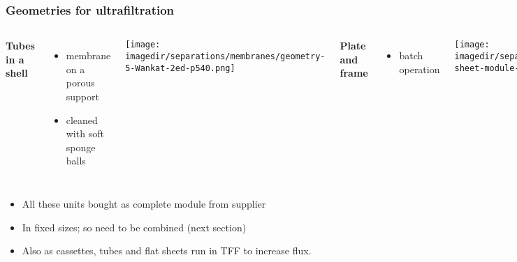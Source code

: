 \begin{frame}\frametitle{Geometries for ultrafiltration}
	\begin{columns}[t]
			\textbf{Tubes in a shell}
				\begin{itemize}
					\item	membrane on a porous support
					\item	cleaned with soft sponge balls
				\end{itemize}
			\begin{center}
				\texttt{[image: \\imagedir/separations/membranes/geometry-5-Wankat-2ed-p540.png]}
			\end{center}
			\textbf{Plate and frame}
				\begin{itemize}
					\item	batch operation
				\end{itemize}
				\begin{center}
					\texttt{[image: \\imagedir/separations/membranes/flat-sheet-module-CRv2-5ed-p456.png]}
				\end{center}
	\end{columns}
	\begin{itemize}
		\item	All these units bought as complete module from supplier
		\item	In fixed sizes; so need to be combined (next section)
		\item	Also as cassettes, tubes and flat sheets run in TFF to increase flux. %
	\end{itemize}
\end{frame}

